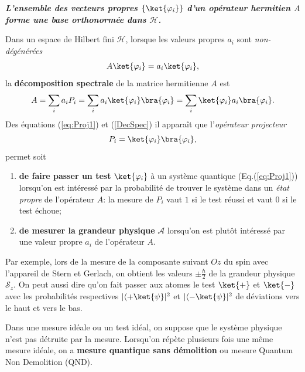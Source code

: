 \textbf{\emph{L'ensemble des vecteurs propres $\{\ket{\varphi_{i}}\}$ d'un
opérateur hermitien $A$ forme une base orthonormée dans $\mathcal{H}$.}}

Dans un espace de Hilbert fini $\mathcal{H}$, lorsque les valeurs propres
$a_{i}$ sont \emph{non-dégénérées}
\begin{equation}
A\ket{\varphi_{i}}=a_{i}\ket{\varphi_{i}},
\end{equation}
la \textbf{décomposition spectrale }de la matrice hermitienne $A$ est%
\begin{equation}
A=\sum_{i}a_{i}P_{i}=\sum_{i}a_{i}\ket{\varphi_{i}}\bra{\varphi_{i}}
=\sum_{i}\ket{\varphi_{i}}a_{i}\bra{\varphi_{i}}.
\label{DecSpec}
\end{equation}
Des équations (\ref{eq:Proj1}) et (\ref{DecSpec}) il apparaît que
l'\emph{opérateur projecteur}
\begin{equation}
P_{i}=\ket{\varphi_{i}}\bra{\varphi_{i}},
\label{OpProj}%
\end{equation}
permet soit

\begin{enumerate}
\item \textbf{de faire passer un test} $\ket{\varphi_{i}}$ à un système
quantique (Eq.(\ref{eq:Proj1})) lorsqu'on est intéressé par la probabilité de
trouver le système dans un \emph{état propre} de l'opérateur $A$: la mesure de
$P_{i}$ vaut $1$ si le test réussi et vaut $0$ si le test échoue;

\item \textbf{de mesurer la grandeur physique} $\mathcal{A}$ lorsqu'on est
plutôt intéressé par une valeur propre $a_{i}$ de l'opérateur $A$.
\end{enumerate}

Par exemple, lors de la mesure de la composante suivant $Oz$ du spin avec
l'appareil de Stern et Gerlach, on obtient les valeurs $\pm\frac{\hbar}{2}$ de
la grandeur physique $\mathcal{S}_{z}$. On peut aussi dire qu'on fait passer
aux atomes le test $\ket{+}$ et $\ket{-}$ avec les probabilités respectives
$|\langle +\ket{\psi}|^{2}$ et $|\langle -\ket{\psi}|^{2}$ de déviations vers le
haut et vers le bas.

\begin{remark}
Dans une mesure idéale ou un test idéal, on suppose que le système physique
n'est pas détruite par la mesure. Lorsqu'on répète plusieurs fois une même
mesure idéale, on a \textbf{mesure quantique sans démolition} ou mesure
Quantum Non Demolition (QND).
\end{remark}

